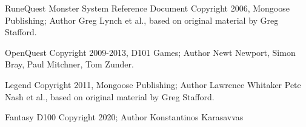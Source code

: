 \begin{scriptsize}
\noindent RuneQuest Monster System Reference Document Copyright 2006, Mongoose Publishing; Author Greg Lynch et al., based on original material by Greg Stafford.

\noindent OpenQuest Copyright 2009-2013, D101 Games; Author Newt Newport, Simon Bray, Paul Mitchner, Tom Zunder.

\noindent Legend Copyright 2011, Mongoose Publishing; Author Lawrence Whitaker Pete Nash et al., based on original material by Greg Stafford.

\noindent Fantasy D100 Copyright 2020; Author Konstantinos Karasavvas
\end{scriptsize}
